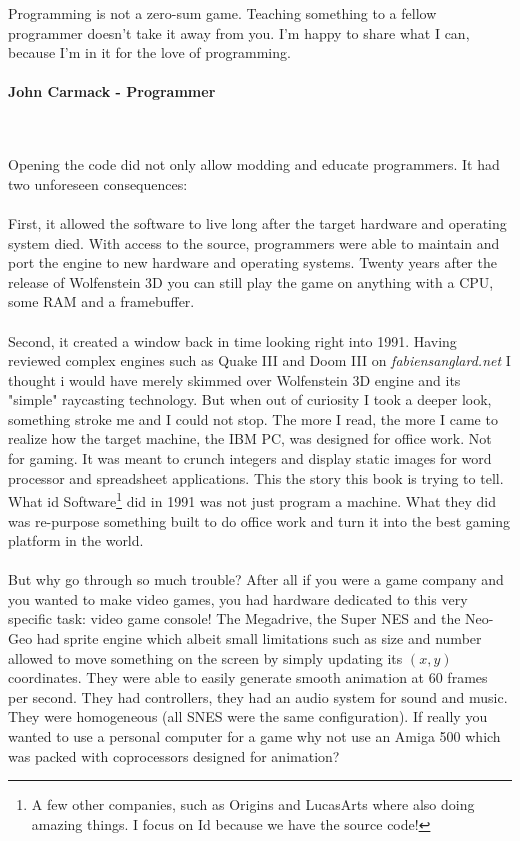  \begin{fancyquotes}
   Programming is not a zero-sum game. Teaching something to a fellow programmer doesn't take it away from you. I'm happy to share what I can, because I'm in it for the love of programming.\\
   \\
\textbf{John Carmack - Programmer}
 \end{fancyquotes}\\
\\
Opening the code did not only allow modding and educate programmers. It had two unforeseen consequences:\\
\\
First, it allowed the software to live long after the target hardware and operating system died. With access to the source, programmers were able to maintain and port the engine to new hardware and operating systems. Twenty years after the release of Wolfenstein 3D you can still play the game on anything with a CPU, some RAM and a framebuffer. \\
\\
Second, it created a window back in time looking right into 1991. Having reviewed complex engines such as Quake III and Doom III on \emph{fabiensanglard.net} I thought i would have merely skimmed over Wolfenstein 3D engine and its "simple" raycasting technology. But when out of curiosity I took a deeper look, something stroke me and I could not stop. The more I read, the more I came to realize how the target machine, the IBM PC, was designed for office work. Not for gaming. It was meant to crunch integers and display static images for word processor and spreadsheet applications. This the story this book is trying to tell. What id Software\footnote{A few other companies, such as Origins and LucasArts where also doing amazing things. I focus on Id because we have the source code!} did in 1991 was not just program a machine. What they did was re-purpose something built to do office work and turn it into the best gaming platform in the world.\\
\\
But why go through so much trouble? After all if you were a game company and you wanted to make video games, you had hardware dedicated to this very specific task: video game console! The Megadrive, the Super NES and the Neo-Geo had sprite engine which albeit small limitations such as size and number allowed to move something on the screen by simply updating its $(x,y)$ coordinates. They were able to easily generate smooth animation at 60 frames per second. They had controllers, they had an audio system for sound and music. They were homogeneous (all SNES were the same configuration). If really you wanted to use a personal computer for a game why not use an Amiga 500 which was packed with coprocessors designed for animation?\\
